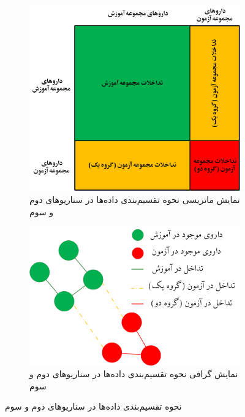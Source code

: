 \begin{figure}[t]
	\centering
	\begin{subfigure}[b]{0.42\textwidth} %
		\centering
		\includegraphics[width=\textwidth]{images/senario-2-matrix.png}
		\caption{نمایش ماتریسی نحوه تقسیم‌بندی داده‌ها در سناریوهای دوم و سوم}
		\label{fig:senario-2-matrix}
	\end{subfigure}
	\hspace{0.04\textwidth} %
	\begin{subfigure}[b]{0.42\textwidth} %
		\centering
		\includegraphics[width=\textwidth]{images/senario-2-graph.png}
		\caption{نمایش گرافی نحوه تقسیم‌بندی داده‌ها در سناریوهای دوم و سوم}
		\label{fig:senario-2-graph}
	\end{subfigure}
	\caption{نحوه تقسیم‌بندی داده‌ها در سناریوهای دوم و سوم}
	\label{fig:senario-2}
\end{figure}

